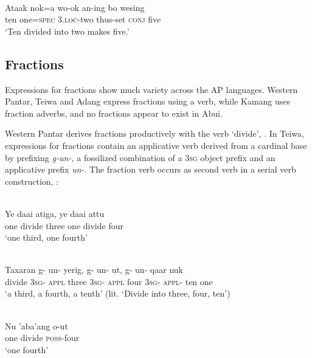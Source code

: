 \ea
\label{ex:8:1247}
\\
 \gll Ataak  nok=a  wo-ok  an-ing  bo  wesing \\
  ten  one=\textsc{spec}  \textsc{3.loc}-two  thus-set  \textsc{conj}  five \\
 \glt`Ten divided into two makes five.'
\z


\subsection{Fractions}
\label{sec:8:Fractions}
Expressions for fractions show much variety across the AP languages. Western Pantar, Teiwa and Adang express fractions using a verb, while Kamang uses fraction adverbs, and no fractions appear to exist in Abui. 

Western Pantar derives fractions productively with the verb `divide', . In Teiwa, expressions for fractions contain an applicative verb derived from a cardinal base by prefixing \textit{g-un-,} a fossilized combination of a 3\textsc{sg} object prefix and an applicative prefix \textit{un-}. The fraction verb occurs as second verb in a serial verb construction, : 


\ea%
\label{bkm:Ref342746525}
 
\\
\gll   Ye  daai  atiga,  ye   daai  attu\\  
   one   divide  three   one  divide  four \\
\glt  `one third, one fourth'   
\z

 

\ea%
\label{bkm:Ref342746583}
\\
\gll  Taxaran  g-  un-  yerig,  g-  un-  ut,  g-  un-  qaar nuk \\  
   divide  \textsc{3sg}-  \textsc{appl} three  \textsc{3sg-}  \textsc{appl} four  \textsc{3sg-}  \textsc{appl-} ten one   \\
\glt  `a third, a fourth, a tenth' (lit. `Divide into three, four, ten')
\z


 

\ea
\label{ex:8:1248}
\\
\gll Nu  'aba'ang  o-ut\\
  one  divide  \textsc{poss}{}-four\\
\glt `one fourth'
\z 

